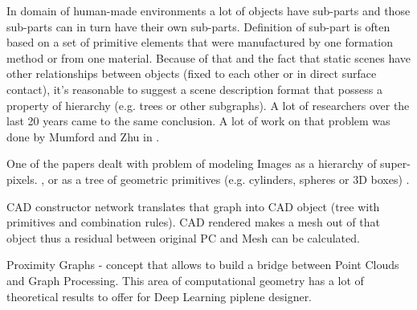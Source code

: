 
In domain of human-made environments a lot of objects have sub-parts and those sub-parts can in turn have their own sub-parts. Definition of sub-part is often based on a set of primitive elements that were manufactured by one formation method or from one material. Because of that and the fact that static scenes have other relationships between objects (fixed to each other or in direct surface contact), it's reasonable to suggest a scene description format that possess a property of hierarchy (e.g. trees or other subgraphs).
A lot of researchers over the last 20 years came to the same conclusion. A lot of work on that problem was done by Mumford and Zhu in \cite{zhu2006stochastic}.

One of the papers dealt with problem of modeling Images as a hierarchy of super-pixels. \cite{russell2009associative}, or as a tree of geometric primitives (e.g. cylinders, spheres or 3D boxes) \cite{li2017grass}.

CAD constructor network translates that graph into CAD object (tree with primitives and combination rules). CAD rendered makes a mesh out of that object thus a residual between original PC and Mesh can be calculated.

Proximity Graphs - concept that allows to build a bridge between Point Clouds and Graph Processing. This area of computational geometry has a lot of theoretical results to offer for Deep Learning piplene designer.


